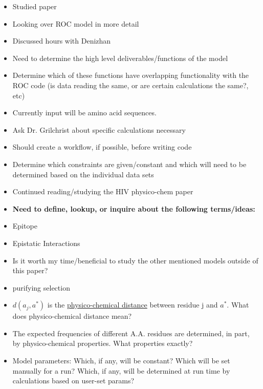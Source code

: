 \documentclass[12pt,hyperref]{labbook}
\begin{document}
\begin{itemize}
  \item Studied paper
  \item Looking over ROC model in more detail
  \item Discussed hours with Denizhan 
\end{itemize}
\begin{itemize}
  \item Need to determine the high level deliverables/functions of the model
  \item Determine which of these functions have overlapping functionality with
the ROC code (is data reading the same, or are certain calculations the same?, etc)
  \item Currently input will be amino acid sequences. 
  \item Ask Dr. Grilchrist about specific calculations necessary
  \item Should create a workflow, if possible, before writing code
  \item Determine which constraints are given/constant and which will need to
be determined based on the individual data sets
\end{itemize}


\begin{itemize}
  \item Continued reading/studying the HIV physico-chem paper 
\end{itemize}
\begin{itemize}
  \item \textbf{Need to define, lookup, or inquire about the following terms/ideas:}
  \item Epitope
  \item Epistatic Interactions
  \item Is it worth my time/beneficial to study the other mentioned models
outside of this paper?
  \item purifying selection
  \item $d(a_{j}, a^{*})$ is the \underline{physico-chemical distance} between
residue j and $a^{*}$. What does physico-chemical distance mean?
  \item The expected frequencies of different A.A. residues are determined, in
part, by physico-chemical properties. What properties exactly? 
  \item Model parameters: Which, if any, will be constant? Which will be
set manually for a run? Which, if any, will be determined at run time by
calculations based on user-set params?  
\end{itemize}
\end{document}
